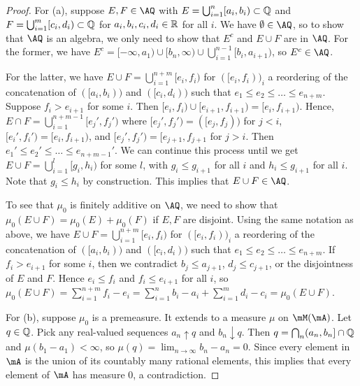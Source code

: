 \documentclass{article}
\begin{document}
\begin{proof}
For (a), suppose $E, F \in \AQ$ with $E = \bigcup_{i=1}^n [a_i, b_i) \subset \mathbb{Q}$ and $F = \bigcup_{i=1}^m [c_i, d_i) \subset \mathbb{Q}$ for $a_i, b_i, c_i, d_i \in \mathbb{R}$ for all $i$.  We have $\emptyset \in \AQ$, so to show that $\AQ$ is an algebra, we only need to show that $E^c$ and $E \cup F$ are in $\AQ$. For the former, we have $E^c = [-\infty, a_1) \cup [b_n, \infty) \cup \bigcup_{i=1}^{n-1} [b_i, a_{i+1})$, so $E^c \in \AQ$. 

For the latter, we have $E \cup F = \bigcup_{i=1}^{n+m} [e_i, f_i)$ for  $([e_i, f_i))_i$ a reordering of the concatenation of $([a_i, b_i))$ and $([c_i, d_i))$ such that $e_1 \le e_2 \le \ldots \le e_{n+m}$.  Suppose $f_i > e_{i+1}$ for some $i$.  Then $[e_i, f_i) \cup [e_{i+1}, f_{i+1}) = [e_i, f_{i+1})$.  Hence, $E \cap F = \bigcup_{i=1}^{n+m-1} [e_j', f_j')$ where $[e_j', f_j') = ([e_j, f_j))$  for $j < i$, $[e_i', f_i') =  [e_i, f_{i+1})$, and $[e_j', f_j') = [e_{j+1}, f_{j+1}$ for $j > i$.  Then $e_1' \le e_2' \le \ldots \le e_{n+m-1}'$.  We can continue this process until we get $E \cup F = \bigcup_{i=1}^l [g_i, h_i)$ for some $l$, with $g_i \le g_{i+1}$ for all $i$ and $h_i \le g_{i+1}$ for all $i$. Note that $g_i \le h_i$ by construction. This implies that $E \cup F \in \AQ$.

To see that $\mu_0$ is finitely additive on $\AQ$, we need to show that $\mu_0(E \cup F) = \mu_0(E) + \mu_0(F)$ if $E,F$ are disjoint. Using the same notation as above, we have $E \cup F = \bigcup_{i=1}^{n+m} [e_i, f_i)$ for  $([e_i, f_i))_i$ a reordering of the concatenation of $([a_i, b_i))$ and $([c_i, d_i))$ such that $e_1 \le e_2 \le \ldots \le e_{n+m}$.  If $f_i > e_{i+1}$ for some $i$, then we contradict $b_j \le a_{j+1}$, $d_j \le c_{j+1}$, or the disjointness of $E$ and $F$.  Hence $e_i \le f_i$ and $f_i \le e_{i+1}$ for all $i$, so $\mu_0(E \cup F) = \sum_{i=1}^{n+m} f_i - e_i = \sum_{i=1}^n b_i - a_i + \sum_{i=1}^m d_i - c_i = \mu_0(E \cup F)$.

For (b), suppose $\mu_0$ is a premeasure.  It extends to a measure $\mu$ on $\mM(\mA)$. Let $q \in \mathbb{Q}$.  Pick any real-valued sequences $a_n \uparrow q$ and $b_n \downarrow q$.  Then $q = \bigcap_n (a_n, b_n] \cap \mathbb{Q}$ and $\mu(b_1 - a_1) < \infty$, so $\mu(q) = \lim_{n\to\infty} b_n - a_n = 0$. Since every element in $\mA$ is the union of its countably many rational elements, this implies that every element of $\mA$ has measure 0, a contradiction.
\end{proof}
\end{document}

